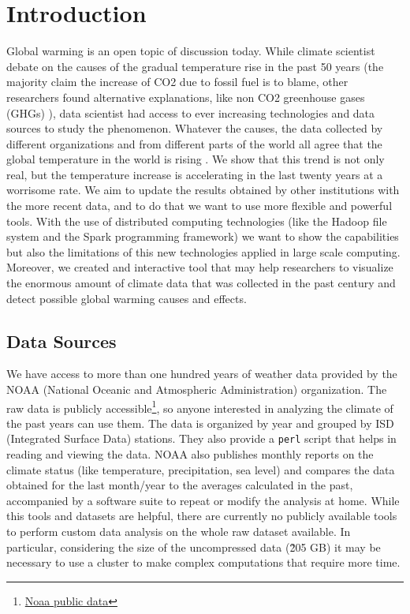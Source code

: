 \documentclass{vldb}
\begin{document}
\maketitle

\begin{abstract}


\end{abstract}

\section{Introduction}
\label{sec:intro}
Global warming is an open topic of discussion today. While climate scientist debate on the causes of the gradual temperature rise in the past 50 years (the majority claim the increase of CO2 due to fossil fuel is to blame, other researchers found alternative explanations, like non CO2 greenhouse gases (GHGs) \cite{hansen2000global}), data scientist had access to ever increasing technologies and data sources to study the phenomenon. Whatever the causes, the data collected by different organizations and from different parts of the world all agree that the global temperature in the world is rising \cite{hansen2006global}. We show that this trend is not only real, but the temperature increase is accelerating in the last twenty years at a worrisome rate. We aim to update the results obtained by other institutions with the more recent data, and to do that we want to use more flexible and powerful tools. With the use of distributed computing technologies (like the Hadoop file system and the Spark programming framework) we want to show the capabilities but also the limitations of this new technologies applied in large scale computing. Moreover, we created and interactive tool that may help researchers to visualize the enormous amount of climate data that was collected in the past century and detect possible global warming causes and effects.

\subsection{Data Sources}
We have access to more than one hundred years of weather data provided by the NOAA (National Oceanic and Atmospheric Administration) organization. The raw data is publicly accessible\footnote{\href{ftp://ftp.ncdc.noaa.gov/pub/data/noaa/}{Noaa public data}}, so anyone interested in analyzing the climate of the past years can use them. The data is organized by year and grouped by ISD (Integrated Surface Data) stations. They also provide a \texttt{perl} script that helps in reading and viewing the data. NOAA also publishes monthly reports on the climate status (like temperature, precipitation, sea level) and compares the data obtained for the last month/year to the averages calculated in the past, accompanied by a software suite to repeat or modify the analysis at home. While this tools and datasets are helpful, there are currently no publicly available tools to perform custom data analysis on the whole raw dataset available. In particular, considering the size of the uncompressed data (\~205 GB) it may be necessary to use a cluster to make complex computations that require more time. \\
\end{document}
